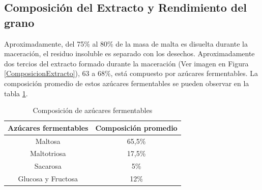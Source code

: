         \subsection{Composición del Extracto y Rendimiento del grano}
            \par Aproximadamente, del 75\% al 80\% de la masa de malta es disuelta durante la maceración, el residuo insoluble es separado con los desechos. Aproximadamente dos tercios del extracto formado durante la maceración (Ver imagen en Figura \ref{ComposicionExtracto}), 63 a 68\%, está compuesto por azúcares fermentables. La composición promedio de estos azúcares fermentables se pueden observar en la tabla \ref{tab:ComposicionAzucaresFermentables}.
            
            \begin{table}[h]
                \centering
                \begin{tabular}{|c|c|}
                    \hline
                     Azúcares fermentables &  Composición promedio \\
                     \hline
                     Maltosa & 65,5\% \\
                     \hline
                     Maltotriosa & 17,5\% \\
                     \hline
                     Sacarosa & 5\% \\
                     \hline
                     Glucosa y Fructosa & 12\% \\
                     \hline
                \end{tabular}
                \caption{Composición de azúcares fermentables}
                \label{tab:ComposicionAzucaresFermentables}
            \end{table}
            
